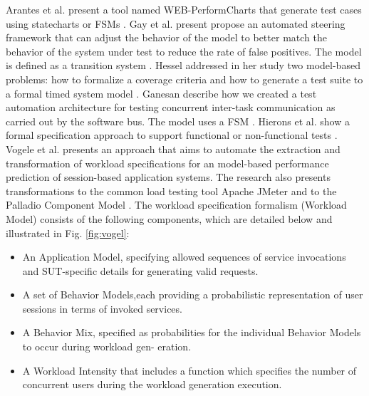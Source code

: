\documentclass[espaco=umemeio,chapter=TITLE,twoside,openright]{abnt}
\begin{document}
Arantes et al. present a tool named WEB-PerformCharts that generate test cases using statecharts or FSMs \cite{Arantes2014}. Gay et al. present propose an automated steering framework that can adjust the behavior of the model to better match the behavior of the system under test to reduce the rate of false positives.  The model is defined as a transition system \cite{Gay2016}. Hessel addressed in her study two model-based problems: how to formalize a coverage criteria and how to generate a test suite to a formal timed system model \cite{Hessel2007}. Ganesan describe how we created a test automation architecture for testing concurrent inter-task communication as carried out by the software bus. The model uses a FSM \cite{Ganesan2016}. Hierons et al. show a formal specification approach to support functional or non-functional tests \cite{Hierons2009}. Vogele et al. presents an approach that aims to automate the extraction and transformation of workload specifications for an model-based performance prediction of session-based application systems.  The research also presents transformations to the common load testing tool Apache JMeter and to the Palladio Component Model \cite{Vogele2016} \cite{utting2010practical}. The workload specification formalism (Workload Model) consists of the following components, which are detailed below and illustrated in Fig. \ref{fig:vogel}:
\begin{itemize}
\item An Application Model, specifying allowed sequences of service invocations and SUT-specific details for generating valid requests.
\item A set of Behavior Models,each providing a probabilistic representation of user sessions in terms of invoked services.
\item A Behavior Mix, specified as probabilities for the individual Behavior Models to occur during workload gen- eration.
\item A Workload Intensity that includes a function which specifies the number of concurrent users during the workload generation execution.
\end{itemize}
\end{document}
